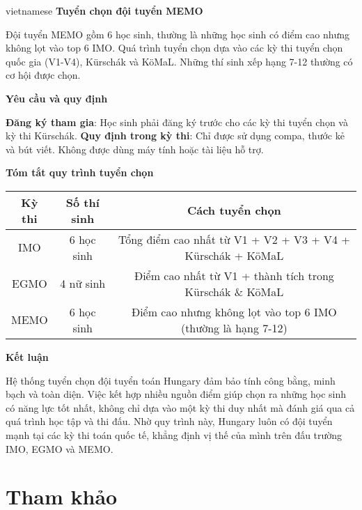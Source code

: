 \documentclass{article}
\begin{document}
\begin{otherlanguage*}{vietnamese}
\textbf{Tuyển chọn đội tuyển MEMO}

Đội tuyển MEMO gồm 6 học sinh, thường là những học sinh có điểm cao nhưng không lọt vào top 6 IMO. Quá trình tuyển chọn dựa vào các kỳ thi tuyển chọn quốc gia (V1-V4), Kürschák và KöMaL.
Những thí sinh xếp hạng 7-12 thường có cơ hội được chọn.

\textbf{Yêu cầu và quy định}

\begin{itemize}[topsep=0pt, partopsep=0pt, itemsep=0pt]
    \ii \textbf{Đăng ký tham gia}: Học sinh phải đăng ký trước cho các kỳ thi tuyển chọn và kỳ thi Kürschák.
    \ii \textbf{Quy định trong kỳ thi}: Chỉ được sử dụng compa, thước kẻ và bút viết. Không được dùng máy tính hoặc tài liệu hỗ trợ.
\end{itemize}

\textbf{Tóm tắt quy trình tuyển chọn}
\begin{center}
    \begin{tabular}{|c|c|c|}
        \hline
        \textbf{Kỳ thi} & \textbf{Số thí sinh} & \textbf{Cách tuyển chọn} \\
        \hline
        IMO & 6 học sinh & Tổng điểm cao nhất từ V1 + V2 + V3 + V4 + Kürschák + KöMaL \\
        \hline
        EGMO & 4 nữ sinh & Điểm cao nhất từ V1 + thành tích trong Kürschák \& KöMaL \\
        \hline
        MEMO & 6 học sinh & Điểm cao nhưng không lọt vào top 6 IMO (thường là hạng 7-12) \\
        \hline
    \end{tabular} 
\end{center}

\textbf{Kết luận}

Hệ thống tuyển chọn đội tuyển toán Hungary đảm bảo tính công bằng, minh bạch và toàn diện.
Việc kết hợp nhiều nguồn điểm giúp chọn ra những học sinh có năng lực tốt nhất, không chỉ dựa vào một kỳ thi duy nhất mà đánh giá qua cả quá trình học tập và thi đấu.
Nhờ quy trình này, Hungary luôn có đội tuyển mạnh tại các kỳ thi toán quốc tế, khẳng định vị thế của mình trên đấu trường IMO, EGMO và MEMO.

\newpage

\section*{Tham khảo}


\end{otherlanguage*}
\end{document}
